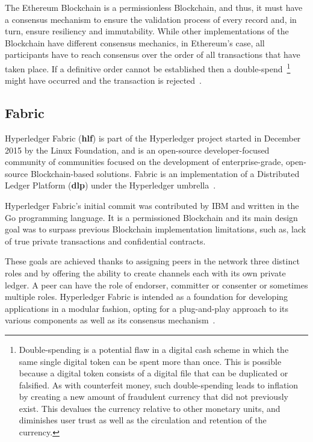 The Ethereum Blockchain is a permissionless Blockchain, and thus, it must
have a consensus mechanism to ensure the validation process of every record
and, in turn, ensure resiliency and immutability. While other implementations
of the Blockchain have different consensus mechanics, in Ethereum’s case, all
participants have to reach consensus over the order of all transactions that
have taken place. If a definitive order cannot be established then a
double-spend~\footnote{Double-spending is a potential flaw in a digital cash
scheme in which the same single digital token can be spent more than once.
This is possible because a digital token consists of a digital file that can
be duplicated or falsified. As with counterfeit money, such double-spending
leads to inflation by creating a new amount of fraudulent currency that did
not previously exist. This devalues the currency relative to other monetary
units, and diminishes user trust as well as the circulation and retention of
the currency.} might have occurred and the transaction is
rejected~\cite{Wood2017}.

\subsection{Fabric}

Hyperledger Fabric (\textbf{hlf}) is part of the Hyperledger project started
in December 2015 by the Linux Foundation, and is an open-source
developer-focused community of communities focused on the development of
enterprise-grade, open-source Blockchain-based solutions.  Fabric is an
implementation of a Distributed Ledger Platform (\textbf{dlp}) under the
Hyperledger umbrella~\cite{Cachin2016}.

Hyperledger Fabric’s initial commit was contributed by IBM and written in the
Go programming language.  It is a permissioned Blockchain and its main design
goal was to surpass previous Blockchain implementation limitations, such as,
lack of true private transactions and confidential contracts.

These goals are achieved thanks to assigning peers in the network three
distinct roles and by offering the ability to create channels each with its
own private ledger.  A peer can have the role of endorser, committer or
consenter or sometimes multiple roles.  Hyperledger Fabric is intended as a
foundation for developing applications in a modular fashion, opting for a
plug-and-play approach to its various components as well as its consensus
mechanism~\cite{HyperledgerFabricDocs2017}.

